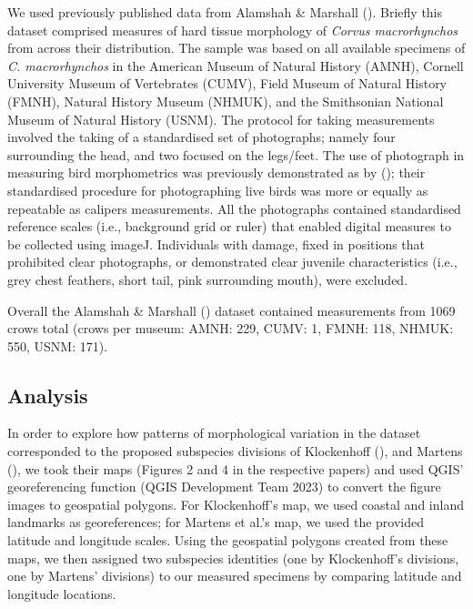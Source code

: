 \documentclass[10pt,a4paper]{article}
\begin{document}
We used previously published data from Alamshah \& Marshall ().
Briefly this dataset comprised measures of hard tissue morphology of \emph{Corvus macrorhynchos} from across their distribution.
The sample was based on all available specimens of \emph{C. macrorhynchos} in the American Museum of Natural History (AMNH), Cornell University Museum of Vertebrates (CUMV), Field Museum of Natural History (FMNH), Natural History Museum (NHMUK), and the Smithsonian National Museum of Natural History (USNM).
The protocol for taking measurements involved the taking of a standardised set of photographs; namely four surrounding the head, and two focused on the legs/feet.
The use of photograph in measuring bird morphometrics was previously demonstrated as by (); their standardised procedure for photographing live birds was more or equally as repeatable as calipers measurements.
All the photographs contained standardised reference scales (i.e., background grid or ruler) that enabled digital measures to be collected using imageJ.
Individuals with damage, fixed in positions that prohibited clear photographs, or demonstrated clear juvenile characteristics (i.e., grey chest feathers, short tail, pink surrounding mouth), were excluded.

Overall the Alamshah \& Marshall () dataset contained measurements from 1069 crows total (crows per museum: AMNH: 229, CUMV: 1, FMNH: 118, NHMUK: 550, USNM: 171).

\subsection{Analysis}\label{analysis}

In order to explore how patterns of morphological variation in the dataset corresponded to the proposed subspecies divisions of Klockenhoff (), and Martens (), we took their maps (Figures 2 and 4 in the respective papers) and used QGIS' georeferencing function (QGIS Development Team 2023) to convert the figure images to geospatial polygons.
For Klockenhoff's map, we used coastal and inland landmarks as georeferences; for Martens et al.'s map, we used the provided latitude and longitude scales.
Using the geospatial polygons created from these maps, we then assigned two subspecies identities (one by Klockenhoff's divisions, one by Martens' divisions) to our measured specimens by comparing latitude and longitude locations.
\end{document}

